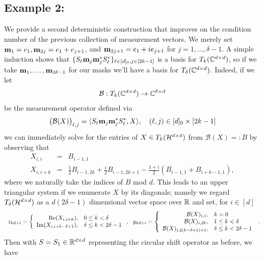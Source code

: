 \subsection*{Example 2:} We provide a second deterministic construction that improves on the condition number of the previous collection of measurement vectors.  We merely set $\mathbf m_1 = e_1, \mathbf m_{2j} = e_1 + e_{j+1}$, and $\mathbf m_{2j + 1} = e_1 + i e_{j+1}$ for $j = 1, \ldots, \delta - 1$.  A simple induction shows that $\{S_\ell \mathbf m_j \mathbf m_j^* S_\ell^*\}_{\ell \in [d]_0, j \in [2k - 1]}$ is a basis for $T_k(\mathbb{C}^{d \times d})$, so if we take $\mathbf m_1, \ldots, \mathbf m_{2\delta - 1}$ for our masks we'll have a basis for $T_{\delta}(\mathbb{C}^{d \times d})$.  Indeed, if we let $$\mathcal{B} : T_k(\mathbb{C}^{d \times d}) \to \mathbb{C}^{\delta \times d}$$ be the measurement operator defined via 
%
$$\big(\mathcal{B}(X)\big)_{\ell, j} = \langle S_\ell \mathbf m_j \mathbf m_j^* S_\ell^*, X \rangle, \quad (\ell, j) \in [d]_0 \times [2k - 1]$$
we can immediately solve for the entries of $X \in T_k(\mathcal{H}^{d \times d})$ from $\mathcal{B}(X) =: B$ by observing that \[\begin{array}{rcl}
X_{i,i} & = & B_{i - 1,1} \\
X_{i, i + k} & = & \frac{1}{2}B_{i - 1, 2k} + \frac{i}{2}B_{i - 1, 2k + 1} - \frac{1 + i}{2} (B_{i - 1, 1} + B_{i + k - 1, 1}), \end{array}\] where we naturally take the indices of $B$ mod $d$.  This leads to an upper triangular system if we enumerate $X$ by its diagonals; namely we regard $T_\delta(\mathcal{H}^{d \times d})$ as a $d(2 \delta - 1)$ dimensional vector space over $\mathbb{R}$ and set, for $i \in  [d]$ 
%
\[\begin{array}{ll}
z_{kd + i} =  \left\{\begin{array}{r@{,\quad}l} \operatorname{Re}(X_{i, i + k}) & 0 \le k < \delta \\ \operatorname{Im}(X_{i, i + k - \delta + 1}) & \delta \le k < 2\delta - 1 \end{array}\right., \ \ 
y_{kd + i}  =  \left\{\begin{array}{r@{,\quad}l} \mathcal{B}(X)_{i, 1} & k = 0 \\ \mathcal{B}(X)_{i, 2k} & 1 \le k < \delta \\  \mathcal{B}(X)_{i, 2(k - \delta + 1) + 1} & \delta \le k < 2 \delta - 1 \end{array}\right.
\end{array}. \] Then with $S = S_1 \in \mathbb{R}^{d \times d}$ representing the circular shift operator as before, we have  %
%
